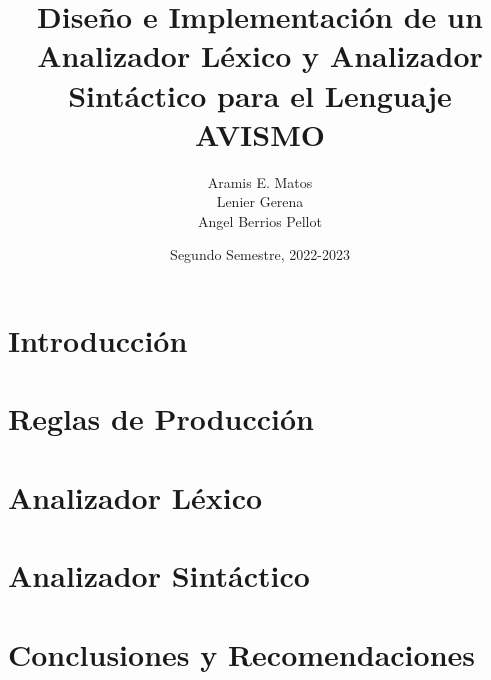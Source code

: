 \documentclass[12pt]{report}
\title{Diseño e Implementación de un Analizador Léxico y Analizador Sintáctico para el Lenguaje AVISMO}
\author{Aramis E. Matos \\ Lenier Gerena \\ Angel Berrios Pellot}
\date{Segundo Semestre, 2022-2023}
\begin{document}
\renewcommand{\acronymname}{Acrónimos}
\renewcommand{\bibname}{Referencias Bibliográficas}
\renewcommand{\contentsname}{Tabla de Contenido}
\renewcommand{\chaptername}{Capítulo}
\renewcommand{\figurename}{Figura}
\renewcommand{\tablename}{Tabla}
\renewcommand{\listingscaption}{Listado}
\renewcommand{\listtablename}{Lista de Tablas}
\renewcommand{\listfigurename}{Lista de Figuras}

\maketitle
\tableofcontents

\chapter{Introducción}



\chapter{Reglas de Producción}



\chapter{Analizador Léxico}



\chapter{Analizador Sintáctico}



\chapter{Conclusiones y Recomendaciones}



\appendix



\listoffigures

\listoftables




\printglossary[type=\acronymtype]
\end{document}
